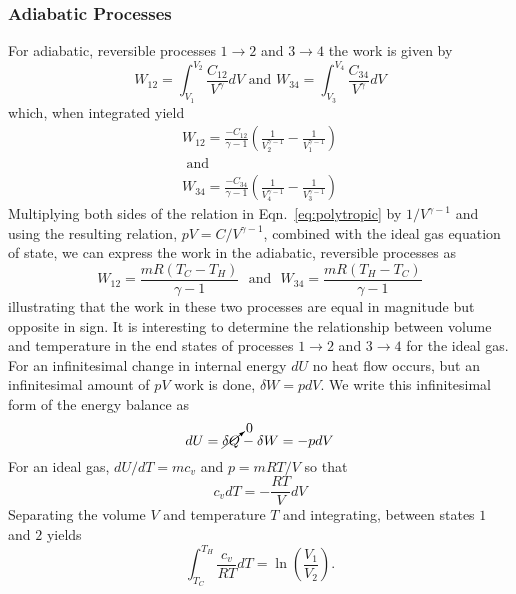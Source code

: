\subsubsection{Adiabatic Processes}
For adiabatic, reversible processes $1 \to 2$ and $3 \to 4$ the work is given by
\begin{equation}
W_{12} = \int_{V_1}^{V_2} \frac{C_{12}}{V^{\gamma}} dV \text{ and } W_{34} = \int_{V_3}^{V_4} \frac{C_{34}}{V^{\gamma}} dV
\end{equation}
which, when integrated yield
\begin{equation}
\begin{gathered}
W_{12} =\frac{-C_{12}}{\gamma-1}\left(\frac{1}{V_2^{\gamma-1}} - \frac{1}{V_1^{\gamma-1}}\right) \\
\text{ and } \\
 W_{34} = \frac{-C_{34}}{\gamma-1}\left(\frac{1}{V_4^{\gamma-1}} - \frac{1}{V_3^{\gamma-1}}\right) 
\end{gathered}
\end{equation}
Multiplying both sides of the relation in Eqn.~\eqref{eq:polytropic} by $1/V^{\gamma-1}$ and using the resulting relation, $pV = C/V^{\gamma-1}$, combined with the ideal gas equation of state, we can express the work in the adiabatic, reversible processes as
\begin{equation}
W_{12} =\frac{mR(T_C - T_H)}{\gamma - 1}  \,\,\text{ and }\,\, W_{34} = \frac{mR(T_H - T_C)}{\gamma - 1}
\end{equation}
illustrating that the work in these two processes are equal in magnitude but opposite in sign. 
It is interesting to determine the relationship between volume and temperature in the end states of processes $1 \to 2$ and $3 \to 4$ for the ideal gas. For an infinitesimal change in internal energy $dU$ no heat flow occurs, but an infinitesimal amount of $pV$ work is done, $\delta W = p dV$. We write this infinitesimal form of the energy balance as
\begin{equation} 
d U = \cancelto{0}{\delta Q} - \delta W = -p dV
\end{equation}
For an ideal gas, $dU/dT = mc_v$ and $p = mRT/V$ so that
\begin{equation}
c_v dT = -\frac{RT}{V} dV
\end{equation}
Separating the volume $V$ and temperature $T$ and integrating, between states $1$ and $2$ yields
\begin{equation} \label{eq:VT12}
\int_{T_C}^{T_H} \frac{c_v}{RT} dT =  \ln\left(\frac{V_1}{V_2}\right).
\end{equation}
